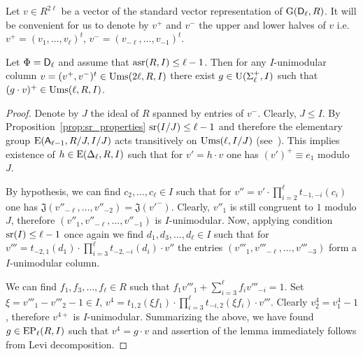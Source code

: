 Let $v\in R^{2\ell}$ be a vector of the standard vector representation of $\operatorname{G}(\mathsf{D}_\ell, R)$.
It will be convenient for us to denote by $v^+$ and $v^-$ the upper and lower halves of $v$ i.e. $v^+=(v_1,\ldots, v_\ell)^t$, $v^-=(v_{-\ell},\ldots, v_{-1})^t$.
\begin{lemma}\label{lemma:asrUnip}
 Let $\Phi=\mathsf{D}_\ell$ and assume that $\operatorname{asr}(R, I)\leq \ell -1$. Then for any $I$-unimodular column $v=(v^+, v^-)^t\in\operatorname{Ums}(2\ell, R, I)$
 there exist $g\in\operatorname{U}(\Sigma^+_\ell, I)$ such that $(g \cdot v)^+ \in \operatorname{Ums}(\ell, R, I)$.
\end{lemma}
\begin{proof} Denote by $J$ the ideal of $R$ spanned by entries of $v^-$. Clearly, $J \leq I$.
By Proposition~\ref{prop:sr_properties} $\operatorname{sr}(I/J) \leq \ell-1$ and therefore
the elementary group $\operatorname{E}(\mathsf{A}_{\ell-1}, R/J, I/J)$ acts transitively on $\operatorname{Ums}(\ell, I/J)$ (see~\cite[Theorem~2.3c]{Va69}). 
This implies existence of $h\in \operatorname{E}(\Delta_\ell, R, I)$ such that for $v' = h \cdot v$ one has $(v')^+ \equiv e_1$ modulo $J$.

By hypothesis, we can find $c_2,\ldots, c_\ell\in I$ such that for $v''=v'\cdot \prod\limits_{i=2}^{\ell}t_{-1, -i}(c_i)$ one has
$\mathfrak{J}(v''_{-\ell},\ldots, v''_{-2}) = \mathfrak{J}(v'^-)$. Clearly, $v''_1$ is still congruent to $1$ modulo $J$, therefore 
$(v''_1, v''_{-\ell},\ldots, v''_{-1})$ is $I$-unimodular. Now, applying condition $\operatorname{sr}(I) \leq \ell-1$ once again we find
$d_1,d_3,\ldots, d_{\ell}\in I$ such that for $v'''=t_{-2,1}(d_1) \cdot \prod\limits_{i=3}^{\ell} t_{-2,-i}(d_i) \cdot v''$
the entries $(v'''_1, v'''_{-\ell},\ldots, v'''_{-3})$ form a $I$-unimodular column.

We can find $f_1, f_3,\ldots, f_\ell \in R$ such that $f_1v'''_1+\sum\limits_{i=3}^\ell f_i v'''_{-i} = 1$.
Set $\xi = v'''_1-v'''_2-1 \in I$, $v^4=t_{1,2}(\xi f_1) \cdot \prod\limits_{i=3}^\ell t_{-i,2}(\xi f_i) \cdot v'''$.
Clearly $v^4_2 = v^4_1-1$, therefore $v^{4+}$ is $I$-unimodular.
Summarizing the above, we have found $g\in \operatorname{EP}_\ell(R, I)$ such that $v^4=g \cdot v$
and assertion of the lemma immediately follows from Levi decomposition. \end{proof}

